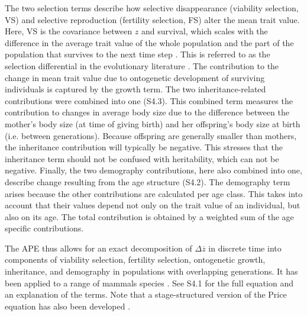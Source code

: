 The two selection terms describe how selective disappearance (viability selection, VS) and selective reproduction (fertility selection, FS) alter the mean trait value. Here, VS is the covariance between $z$ and survival, which scales with the difference in the average trait value of the whole population and the part of the population that survives to the next time step \parencite[e.g.][]{rebke2012}. This is referred to as the selection differential in the evolutionary literature \parencite{Robertson1966,Lande1983}. The contribution to the change in mean trait value due to ontogenetic development of surviving individuals is captured by the growth term. The two inheritance-related contributions were combined into one (S4.3). This combined term measures the contribution to changes in average body size due to the difference between the mother's body size (at time of giving birth) and her offspring's body size at birth (i.e. between generations). Because offspring are generally smaller than mothers, the inheritance contribution will typically be negative. This stresses that the inheritance term should not be confused with heritability, which can not be negative.
Finally, the two demography contributions, here also combined into one, describe change resulting from the age structure (S4.2). The demography term arises because the other contributions are calculated per age class. This takes into account that their values depend not only on the trait value of an individual, but also on its age. The total contribution is obtained by a weighted sum of the age specific contributions. 

The APE thus allows for an exact decomposition of $\Delta \overline z$ in discrete time into components of viability selection, fertility selection, ontogenetic growth, inheritance, and demography in populations with overlapping generations.  It has been applied to a range of mammals species \parencite{Coulson2008,Ozgul2009,Ozgul2010,Canale2016}. See S4.1 for the full equation and an explanation of the terms. Note that a  stage-structured version of the Price equation has also been developed \parencite{Barfield2011}.

